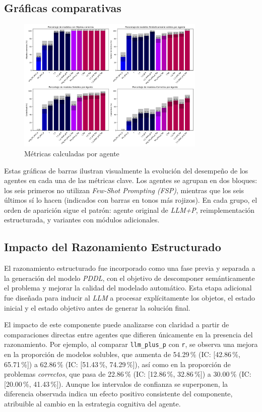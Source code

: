 \subsection*{Gráficas comparativas}

\begin{figure}[H]
\centering
\includegraphics[width=0.8\textwidth]{Graphics/metrics_grid.png}
\caption{Métricas calculadas por agente}
\label{fig:objects}
\end{figure}

Estas gráficas de barras ilustran visualmente la evolución del desempeño de los agentes en cada una de las métricas clave. Los agentes se agrupan en dos bloques: los seis primeros no utilizan \textit{Few-Shot Prompting (FSP)}, mientras que los seis últimos sí lo hacen (indicados con barras en tonos más rojizos). En cada grupo, el orden de aparición sigue el patrón: agente original de \textit{LLM+P}, reimplementación estructurada, y variantes con módulos adicionales.

\subsection{Impacto del Razonamiento Estructurado}

El razonamiento estructurado fue incorporado como una fase previa y separada a la generación del modelo \textit{PDDL}, con el objetivo de descomponer semánticamente el problema y mejorar la calidad del modelado automático. Esta etapa adicional fue diseñada para inducir al \textit{LLM} a procesar explícitamente los objetos, el estado inicial y el estado objetivo antes de generar la solución final.

El impacto de este componente puede analizarse con claridad a partir de comparaciones directas entre agentes que difieren únicamente en la presencia del razonamiento. Por ejemplo, al comparar \texttt{llm\_plus\_p} con \texttt{r}, se observa una mejora en la proporción de modelos solubles, que aumenta de 54.29\,\% (IC: [42.86\,\%, 65.71\,\%]) a 62.86\,\% (IC: [51.43\,\%, 74.29\,\%]), así como en la proporción de problemas \textit{correctos}, que pasa de 22.86\,\% (IC: [12.86\,\%, 32.86\,\%]) a 30.00\,\% (IC: [20.00\,\%, 41.43\,\%]). Aunque los intervalos de confianza se superponen, la diferencia observada indica un efecto positivo consistente del componente, atribuible al cambio en la estrategia cognitiva del agente.

